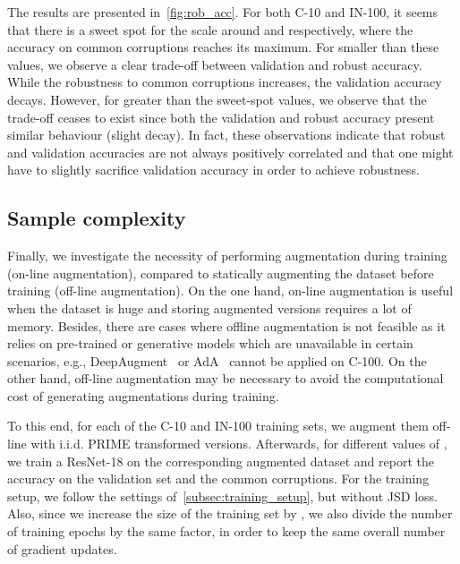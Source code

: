 \documentclass[runningheads]{llncs}
\begin{document}
The results are presented in~\cref{fig:rob_acc}. For both C-10 and IN-100, it seems that there is a sweet spot for the scale around  and  respectively, where the accuracy on common corruptions reaches its maximum. For  smaller than these values, we observe a clear trade-off between validation and robust accuracy. While the robustness to common corruptions increases, the validation accuracy decays. However, for  greater than the sweet-spot values, we observe that the trade-off ceases to exist since both the validation and robust accuracy present similar behaviour (slight decay). In fact, these observations indicate that robust and validation accuracies are not always positively correlated and that one might have to slightly sacrifice validation accuracy in order to achieve robustness.

\subsection{Sample complexity}
\label{subsec:sample-complexity}

Finally, we investigate the necessity of performing augmentation during training (on-line augmentation), compared to statically augmenting the dataset before training (off-line augmentation). On the one hand, on-line augmentation is useful when the dataset is huge and storing augmented versions requires a lot of memory. Besides, there are cases where offline augmentation is not feasible as it relies on pre-trained or generative models which are unavailable in certain scenarios, e.g., DeepAugment~\cite{deepaugment2021} or AdA~\cite{calian2021} cannot be applied on C-100. On the other hand, off-line augmentation may be necessary to avoid the computational cost of generating augmentations during training.

To this end, for each of the C-10 and IN-100 training sets, we augment them off-line with  i.i.d. PRIME transformed versions. Afterwards, for different values of , we train a ResNet-18 on the corresponding augmented dataset and report the accuracy on the validation set and the common corruptions. For the training setup, we follow the settings of~\cref{subsec:training_setup}, but without JSD loss. Also, since we increase the size of the training set by , we also divide the number of training epochs by the same factor, in order to keep the same overall number of gradient updates.
\end{document}
